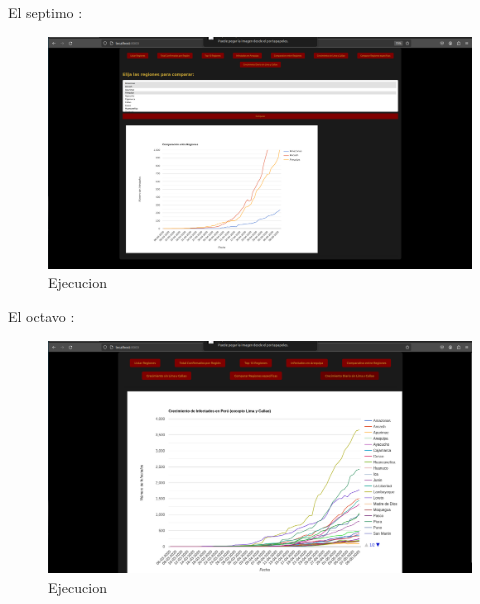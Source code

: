 El septimo :
\begin{figure}[H]
  \centering
  \includegraphics[width=1.0\textwidth]{img/Ej7.png}
  \caption{Ejecucion}
\end{figure}
El octavo :
\begin{figure}[H]
  \centering
  \includegraphics[width=1.0\textwidth]{img/Ej8.png}
  \caption{Ejecucion}
\end{figure}